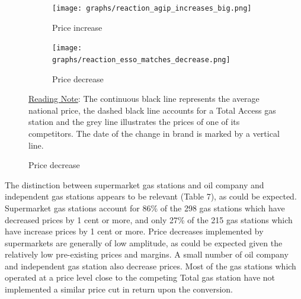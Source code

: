 \documentclass[english]{article}
\begin{document}
\begin{figure}%
\centering
\caption{Examples of price series of Total Access competitors}
\label{fig:price_reaction_examples}
\begin{subfigure}[b]{\columnwidth}
\centering
\texttt{[image: graphs/reaction\_agip\_increases\_big.png]}
\caption[short]{Price increase}
\end{subfigure}
\begin{subfigure}[b]{\columnwidth}
\centering
\texttt{[image: graphs/reaction\_esso\_matches\_decrease.png]}
\caption[short]{Price decrease}
\end{subfigure}
\flushleft
{\small{}\uline{Reading Note}}{\small{}: } The continuous black line  represents the average national price, the dashed black line accounts for a Total Access gas station and the grey line illustrates the prices of one of its competitors. The date of the change in brand is marked by a vertical line. \medskip{}
\end{figure}

The distinction between supermarket gas stations and oil company and independent gas stations appears to be relevant (Table 7), as could be expected. Supermarket gas stations account for 86\% of the 298 gas stations which have decreased prices by 1 cent or more, and only 27\% of the 215 gas stations which have increase prices by 1 cent or more. Price decreases implemented by supermarkets are generally of low amplitude, as could be expected given the relatively low pre-existing prices and margins. A small number of oil company and independent gas station also decrease prices. Most of the gas stations which operated at a price level close to the competing Total gas station have not implemented a similar price cut in return upon
the conversion. \medskip{}
\end{document}
